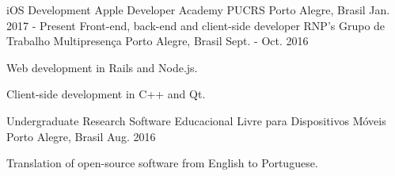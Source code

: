 \begin{cventries}
  \cventry
    {iOS Development}
    {Apple Developer Academy PUCRS}
    {Porto Alegre, Brasil}
    {Jan. 2017 - Present}
    {}
  \cventry
    {Front-end, back-end and client-side developer}
    {RNP's Grupo de Trabalho Multipresença}
    {Porto Alegre, Brasil}
    {Sept. - Oct. 2016}
    {
      \begin{cvitems}
        \item {Web development in Rails and Node.js.}
        \item {Client-side development in C++ and Qt.}
      \end{cvitems}
    }
  \cventry
    {Undergraduate Research}
    {Software Educacional Livre para Dispositivos Móveis}
    {Porto Alegre, Brasil}
    {Aug. 2016}
    {
      \begin{cvitems}
        \item {Translation of open-source software from English to Portuguese.}
      \end{cvitems}
    }
\end{cventries}

